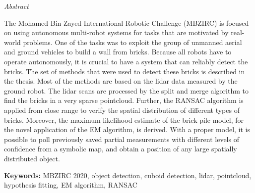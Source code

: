 \vfill
\begin{center}
{\it \large Abstract}
\vspace{0.2cm}

\begin{minipage}{0.8\textwidth}{
The Mohamed Bin Zayed International Robotic Challenge (MBZIRC) is focused on using autonomous multi-robot systems for tasks that are motivated by real-world problems. One of the tasks was to exploit the group of unmanned aerial and ground vehicles to build a wall from bricks. Because all robots have to operate autonomously, it is crucial to have a system that can reliably detect the bricks. The set of methods that were used to detect these bricks is described in the thesis. Most of the methods are based on the lidar data measured by the ground robot. The lidar scans are processed by the split and merge algorithm to find the bricks in a very sparse pointcloud. Further, the RANSAC algorithm is applied from close range to verify the spatial distribution of different types of bricks. Moreover, the maximum likelihood estimate of the brick pile model, for the novel application of the EM algorithm, is derived. With a proper model, it is possible to poll previously saved partial measurements with different levels of confidence from a symbolic map, and obtain a position of any large spatially distributed object.
\vspace{3mm}
\par \textbf{Keywords:} MBZIRC 2020, object detection, cuboid detection, lidar, pointcloud, hypothesis fitting, EM algorithm, RANSAC
}
\end{minipage}
\end{center}
\vfill
\vspace{1cm}
